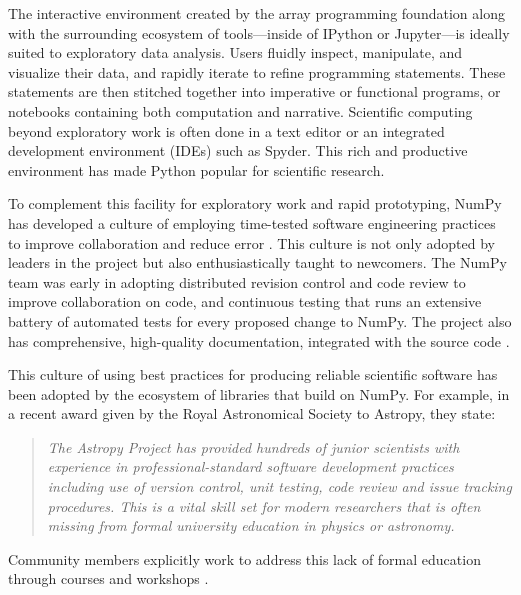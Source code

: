 The interactive environment created by the array programming
foundation along with the surrounding ecosystem of tools---inside of
IPython or Jupyter---is ideally suited to exploratory data analysis.
Users fluidly inspect, manipulate, and visualize their data, and
rapidly iterate to refine programming statements. These statements are
then stitched together into imperative or functional programs, or
notebooks containing both computation and narrative.
Scientific computing beyond exploratory work is often done in a text editor
or an integrated development environment (IDEs) such as Spyder.
This rich and productive environment has made Python popular
for scientific research.

To complement this facility for exploratory work and rapid
prototyping, NumPy has developed a culture of
employing time-tested software engineering practices to improve collaboration and
reduce error \cite{millman2014developing}.  This culture is not only
adopted by leaders in the project but also enthusiastically taught to
newcomers. The NumPy team was early in adopting distributed revision
control and code review to improve collaboration on code, and
continuous testing that runs an extensive battery of automated tests for
every proposed change to NumPy.  The project also has comprehensive,
high-quality documentation, integrated with the source
code \cite{vanderwalt2008scipy,harrington2008scipy,harrington2009scipy}.


This culture of using best practices for producing reliable scientific software
has been adopted by the ecosystem of libraries that build on NumPy.
For example, in a recent award given by the Royal Astronomical Society to
Astropy, they state:
\begin{quotation}
\noindent\emph{The Astropy Project has provided hundreds of junior scientists
with experience in professional-standard software development practices
including use of version control, unit testing, code review and issue tracking
procedures. This is a vital skill set for modern researchers that is often
missing from formal university education in physics or astronomy.}
\end{quotation}
Community members explicitly work to address this lack of formal education
through courses and workshops
\cite{wilson-software-carpentry,hannay-scientific-software-survey,millman2018teaching}.


